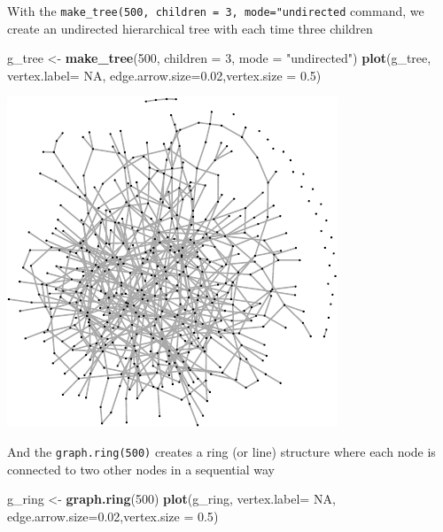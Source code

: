 \documentclass[]{article}
\newenvironment{Shaded}{\begin{snugshade}}{\end{snugshade}}
\newcommand{\KeywordTok}[1]{\textcolor[rgb]{0.13,0.29,0.53}{\textbf{{#1}}}}
\newcommand{\DataTypeTok}[1]{\textcolor[rgb]{0.13,0.29,0.53}{{#1}}}
\newcommand{\DecValTok}[1]{\textcolor[rgb]{0.00,0.00,0.81}{{#1}}}
\newcommand{\FloatTok}[1]{\textcolor[rgb]{0.00,0.00,0.81}{{#1}}}
\newcommand{\StringTok}[1]{\textcolor[rgb]{0.31,0.60,0.02}{{#1}}}
\newcommand{\OtherTok}[1]{\textcolor[rgb]{0.56,0.35,0.01}{{#1}}}
\newcommand{\NormalTok}[1]{{#1}}
\theoremstyle{definition}
\theoremstyle{definition}
\theoremstyle{definition}
\theoremstyle{remark}
\begin{document}
With the \texttt{make\_tree(500,\ children\ =\ 3,\ mode="undirected}
command, we create an undirected hierarchical tree with each time three
children

\begin{Shaded}
\begin{Highlighting}[]
\NormalTok{g_tree <-}\StringTok{ }\KeywordTok{make_tree}\NormalTok{(}\DecValTok{500}\NormalTok{, }\DataTypeTok{children =} \DecValTok{3}\NormalTok{, }\DataTypeTok{mode =} \StringTok{"undirected"}\NormalTok{)}
\KeywordTok{plot}\NormalTok{(g_tree, }\DataTypeTok{vertex.label=} \OtherTok{NA}\NormalTok{, }\DataTypeTok{edge.arrow.size=}\FloatTok{0.02}\NormalTok{,}\DataTypeTok{vertex.size =} \FloatTok{0.5}\NormalTok{)}
\end{Highlighting}
\end{Shaded}

\includegraphics{ResearchTools_files/figure-latex/unnamed-chunk-54-1.pdf}

And the \texttt{graph.ring(500)} creates a ring (or line) structure
where each node is connected to two other nodes in a sequential way

\begin{Shaded}
\begin{Highlighting}[]
\NormalTok{g_ring <-}\StringTok{ }\KeywordTok{graph.ring}\NormalTok{(}\DecValTok{500}\NormalTok{)}
\KeywordTok{plot}\NormalTok{(g_ring, }\DataTypeTok{vertex.label=} \OtherTok{NA}\NormalTok{, }\DataTypeTok{edge.arrow.size=}\FloatTok{0.02}\NormalTok{,}\DataTypeTok{vertex.size =} \FloatTok{0.5}\NormalTok{)}
\end{Highlighting}
\end{Shaded}
\end{document}
